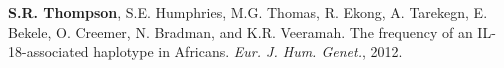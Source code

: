 \documentclass[10pt]{article}
\begin{document}
\begin{bibenum}
%
%
%
%
	\item {\bf S.R. Thompson}, S.E. Humphries, M.G. Thomas, R. Ekong, A. Tarekegn, E. Bekele, O. Creemer, N. Bradman, and K.R. Veeramah.  The frequency of an IL-18-associated haplotype in Africans. {\em Eur. J. Hum. Genet.}, 2012.\\ 


\end{bibenum}
\end{document}
